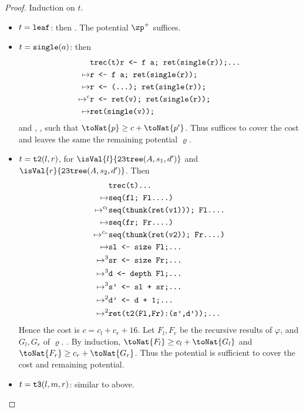 \begin{proof}
Induction on $t$.
  \begin{itemize}
    \item $t = \mathtt{leaf}$: then . 
      The potential $\zp^+$ suffices. 
    \item $t = \mathtt{single}(a)$: then 
      \begin{align*}
        &\texttt{trec(t){r <- f a; ret(single(r));\dots}}\\
        \mapsto& \texttt{r <- f a; ret(single(r));}\\
        \mapsto& \texttt{r <- (...); ret(single(r));}\\
        \mapsto^c& \texttt{r <- ret(v); ret(single(r));}\\
        \mapsto& \texttt{ret(single(v));}
      \end{align*}
      and , , such that $\toNat{p} \ge c + \toNat{p'}$.
      Thus  suffices to cover the cost and
      leaves the same the remaining potential $\varrho$.
    \item $t = \mathtt{t2}(l,r)$, for $\isVal{l}{\tttree{A}{s_1}{d'}}$ and $\isVal{r}{\tttree{A}{s_2}{d'}}$. Then 
      \begin{align*}
        &\texttt{trec(t){\dots}} \\
        \mapsto& \texttt{seq(fl; Fl.\dots)}\\
        \mapsto^{c_l}& \texttt{seq(thunk(ret(v1))); Fl.\dots}\\
        \mapsto& \texttt{seq(fr; Fr.\dots)}\\
        \mapsto^{c_r}& \texttt{seq(thunk(ret(v2)); Fr.\dots)}\\
        \mapsto& \texttt{sl <- size Fl;\dots}\\
        \mapsto^3& \texttt{sr <- size Fr;\dots}\\
        \mapsto^3& \texttt{d <- depth Fl;\dots}\\
        \mapsto^3& \texttt{s' <- sl + sr;\dots}\\
        \mapsto^2& \texttt{d' <- d + 1;\dots}\\
        \mapsto^2& \texttt{ret(t2(Fl,Fr):(s',d'));\dots}\\
      \end{align*}
      Hence the cost is $c = c_l+c_r + 16$.
      Let $F_l,F_r$ be the recursive results of $\varphi$, and $G_l,G_r$ of $\varrho$.
      . By induction, 
      $\toNat{F_l} \ge c_l + \toNat{G_l}$ and $\toNat{F_r} \ge c_r + \toNat{G_r}$.
      Thus the potential  is sufficient 
      to cover the cost and remaining potential.
    \item $t = \mathtt{t3}(l,m,r)$: similar to above. 
  \end{itemize}
\end{proof}

